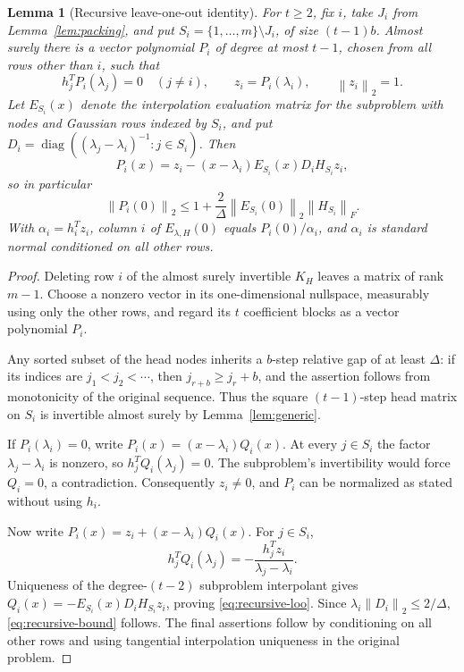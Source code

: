 \documentclass[11pt]{article}
\newtheorem{lemma}[theorem]{Lemma}
\theoremstyle{definition}
\newcommand{\diag}{\operatorname{diag}}
\newcommand{\norm}[1]{\left\lVert #1\right\rVert}
\begin{document}
\begin{lemma}[Recursive leave-one-out identity]
\label{lem:recursive-loo}
For $t\geq2$, fix $i$, take $J_i$ from Lemma~\ref{lem:packing}, and put
$S_i=\{1,\ldots,m\}\setminus J_i$, of size $(t-1)b$.
Almost surely there is a vector polynomial $P_i$ of degree at most $t-1$,
chosen from all rows other than $i$, such that
\[
 h_j^TP_i(\lambda_j)=0\quad(j\ne i),\qquad
 z_i=P_i(\lambda_i),\qquad \norm{z_i}_2=1.
\]
Let $E_{S_i}(x)$ denote the interpolation evaluation matrix for the
subproblem with nodes and Gaussian rows indexed by $S_i$, and put
$D_i=\diag((\lambda_j-\lambda_i)^{-1}:j\in S_i)$. Then
\begin{equation}
 P_i(x)=z_i-(x-\lambda_i)E_{S_i}(x)D_iH_{S_i}z_i,
 \label{eq:recursive-loo}
\end{equation}
so in particular
\begin{equation}
 \norm{P_i(0)}_2\leq
 1+\frac2\Delta\norm{E_{S_i}(0)}_2\norm{H_{S_i}}_F.
 \label{eq:recursive-bound}
\end{equation}
With $\alpha_i=h_i^Tz_i$, column $i$ of $E_{\lambda,H}(0)$ equals
$P_i(0)/\alpha_i$, and $\alpha_i$ is standard normal conditioned on all
other rows.
\end{lemma}
\begin{proof}
Deleting row $i$ of the almost surely invertible $K_H$ leaves a matrix of
rank $m-1$. Choose a nonzero vector in its one-dimensional nullspace,
measurably using only the other rows, and regard its $t$ coefficient blocks
as a vector polynomial $P_i$.

Any sorted subset of the head nodes inherits a $b$-step relative gap of
at least $\Delta$: if its indices are $j_1<j_2<\cdots$, then
$j_{r+b}\geq j_r+b$, and the assertion follows from monotonicity of the
original sequence. Thus the square $(t-1)$-step head matrix on $S_i$ is
invertible almost surely by Lemma~\ref{lem:generic}.

If $P_i(\lambda_i)=0$, write $P_i(x)=(x-\lambda_i)Q_i(x)$. At every
$j\in S_i$ the factor $\lambda_j-\lambda_i$ is nonzero, so
$h_j^TQ_i(\lambda_j)=0$. The subproblem's invertibility would force
$Q_i=0$, a contradiction. Consequently $z_i\ne0$, and $P_i$ can be
normalized as stated without using $h_i$.

Now write $P_i(x)=z_i+(x-\lambda_i)Q_i(x)$. For $j\in S_i$,
\[
 h_j^TQ_i(\lambda_j)
 =-\frac{h_j^Tz_i}{\lambda_j-\lambda_i}.
\]
Uniqueness of the degree-$(t-2)$ subproblem interpolant gives
$Q_i(x)=-E_{S_i}(x)D_iH_{S_i}z_i$, proving
\eqref{eq:recursive-loo}. Since $\lambda_i\norm{D_i}_2\leq2/\Delta$,
\eqref{eq:recursive-bound} follows. The final assertions follow by
conditioning on all other rows and using tangential interpolation
uniqueness in the original problem.
\end{proof}
\end{document}
